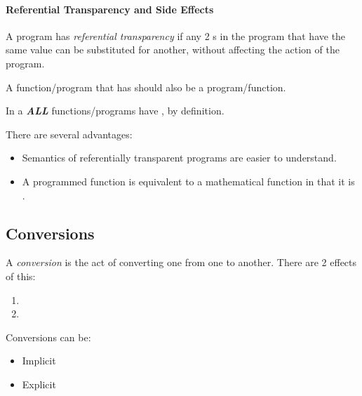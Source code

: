 \paragraph{Referential Transparency and Side Effects}\label{par:Operand_Evaluation-Referential_Transparency_Side_Effects}
\begin{definition}\label{def:Referential_Transparency}
  A program has \emph{referential transparency} if any 2 s in the program that have the same value can be substituted for another, without affecting the action of the program.

  \begin{remark}
    A function/program that has  should also be a  program/function.
  \end{remark}

  \begin{remark}
    In a  \textbf{\emph{ALL}} functions/programs have , by definition.
  \end{remark}
\end{definition}

There are several advantages:
\begin{itemize}[noitemsep]
\item Semantics of referentially transparent programs are easier to understand.
\item A programmed function is equivalent to a mathematical function in that it is .
\end{itemize}

\subsection{ Conversions}\label{subsec:Type_Conversions}
\begin{definition}\label{def:Type_Conversion}
  A \emph{ conversion} is the act of converting one  from one to another.
  There are 2 effects of this:
  \begin{enumerate}[noitemsep]
  \item {}
  \item {}
  \end{enumerate}

  Conversions can be:
  \begin{itemize}[noitemsep]
  \item Implicit
  \item Explicit
  \end{itemize}
\end{definition}

